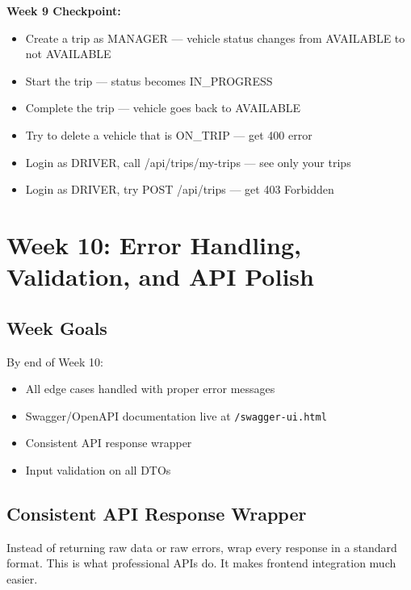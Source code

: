 \documentclass[12pt,a4paper]{report}
\newcommand{\code}[1]{\texttt{\textcolor{keywordblue}{#1}}}
\begin{document}
\begin{tcolorbox}[successbox]
\textbf{Week 9 Checkpoint:}
\begin{itemize}
  \item[$\checkmark$] Create a trip as MANAGER --- vehicle status changes from AVAILABLE to not AVAILABLE
  \item[$\checkmark$] Start the trip --- status becomes IN\_PROGRESS
  \item[$\checkmark$] Complete the trip --- vehicle goes back to AVAILABLE
  \item[$\checkmark$] Try to delete a vehicle that is ON\_TRIP --- get 400 error
  \item[$\checkmark$] Login as DRIVER, call /api/trips/my-trips --- see only your trips
  \item[$\checkmark$] Login as DRIVER, try POST /api/trips --- get 403 Forbidden
\end{itemize}
\end{tcolorbox}

\chapter{Week 10: Error Handling, Validation, and API Polish}

\section{Week Goals}

By end of Week 10:
\begin{itemize}
  \item All edge cases handled with proper error messages
  \item Swagger/OpenAPI documentation live at \code{/swagger-ui.html}
  \item Consistent API response wrapper
  \item Input validation on all DTOs
\end{itemize}

\section{Consistent API Response Wrapper}

\begin{tcolorbox}[notebox]
Instead of returning raw data or raw errors, wrap every response in a standard format. This is what professional APIs do. It makes frontend integration much easier.
\end{tcolorbox}
\end{document}
